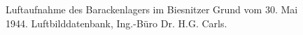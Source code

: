 \documentclass[a4paper,12pt,ngerman,
]{nisebook}
\begin{document}
\begin{flushleft}
    \setlength{\fboxsep}{0pt}
\begin{figure}
	\caption[Luftaufnahme des Lagers, 30. Mai 1945]{Luftaufnahme des Barackenlagers im Biesnitzer Grund vom 30. Mai 1944. Luftbilddatenbank, Ing.-Büro Dr. H.G. Carls.}
\end{figure}
\end{flushleft}

\end{document}
